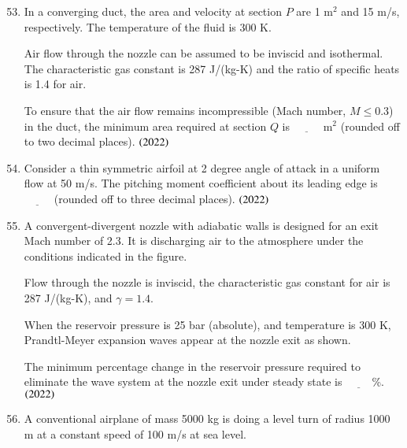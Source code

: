 \documentclass[journal,9pt,onecolumn]{IEEEtran}
\begin{document}
\begin{enumerate}
\setcounter{enumi}{52}
\item In a converging duct, the area and velocity at section $P$ are 1 m$^2$ and 15 m/s, respectively. The temperature of the fluid is 300 K.

    Air flow through the nozzle can be assumed to be inviscid and isothermal. The characteristic gas constant is 287 J/(kg-K) and the ratio of specific heats is 1.4 for air.

		To ensure that the air flow remains incompressible (Mach number, $M \leq 0.3$) in the duct, the minimum area required at section $Q$ is $\underline{\hspace{1cm}}$ m$^2$ (rounded off to two decimal places).  \hfill $\left(2022\right)$
\begin{center}
    
\end{center}

\item Consider a thin symmetric airfoil at 2 degree angle of attack in a uniform flow at 50 m/s. The pitching moment coefficient about its leading edge is $\underline{\hspace{1cm}}$ (rounded off to three decimal places).  \hfill $\left(2022\right)$


 \item A convergent-divergent nozzle with adiabatic walls is designed for an exit Mach number of 2.3. It is discharging air to the atmosphere under the conditions indicated in the figure.

    Flow through the nozzle is inviscid, the characteristic gas constant for air is 287 J/(kg-K), and $\gamma = 1.4$.

    When the reservoir pressure is 25 bar (absolute), and temperature is 300 K, Prandtl-Meyer expansion waves appear at the nozzle exit as shown.

    The minimum percentage change in the reservoir pressure required to eliminate the wave system at the nozzle exit under steady state is $\underline{\hspace{1cm}}$\%.    \hfill $\left(2022\right)$
\begin{center}
    
\end{center}


\item A conventional airplane of mass 5000 kg is doing a level turn of radius 1000 m at a constant speed of 100 m/s at sea level.


\end{enumerate}
\end{document}
